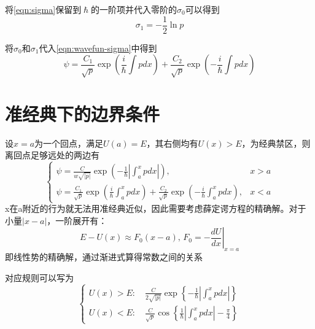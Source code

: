 \documentclass[12pt, a4paper, oneside]{ctexbook}
\newcounter{#2}
\newcounter{#2}[#1]
\numberwithin{#2}{#1}
\newcommand{\xkuo}[1]{\left(#1\right)}
\newcommand{\dkuo}[1]{\left\lbrace#1\right\rbrace}
\newcommand{\dao}[2]{\frac{d#1}{d#2}}
\newcommand{\ji}[2]{\int_{#1}^{#2}}
\newcommand{\jdz}[1]{\left|#1\right|}
\begin{document}
            \begin{deduce}
              将\autoref{eqn:sigma}保留到\(\hslash\)的一阶项并代入零阶的\(\sigma_0\)可以得到
              \begin{equation}
                \sigma_1=-\frac12\ln p
              \end{equation}
            \end{deduce}
            \begin{deduce}
              将\(\sigma_0\)和\(\sigma_1\)代入\autoref{eqn:wavefun-sigma}中得到
              \begin{equation}
                \psi=\frac{C_1}{\sqrt p}\exp\xkuo{\frac i\hslash\int pdx}+\frac{C_2}{\sqrt p}\exp\xkuo{-\frac i\hslash\int pdx}
              \end{equation}
            \end{deduce}
            \section{准经典下的边界条件}
            \begin{deduce}
              设\(x=a\)为一个回点，满足\(U(a)=E\)，其右侧均有\(U(x)>E\)，为经典禁区，则离回点足够远处的两边有
              \begin{equation}
                \begin{cases}
                  \psi=\frac{C}{w\sqrt{|p|}}\exp\xkuo{-\frac1\hslash\jdz{\ji{a}{x}pdx}}, &x>a\\
                  \psi=\frac{C_1}{\sqrt p}\exp\xkuo{\frac i\hslash\ji ax pdx}+\frac{C_2}{\sqrt p}\exp\xkuo{-\frac i\hslash\ji ax pdx},&x<a
                \end{cases}
              \end{equation}
              x在a附近的行为就无法用准经典近似，因此需要考虑薛定谔方程的精确解。对于小量\(|x-a|\)，一阶展开有：
              \begin{equation}
                E-U(x)\approx F_0(x-a),\, F_0=-\left.\dao Ux\right|_{x=a}
              \end{equation}
              即线性势的精确解，通过渐进式算得常数之间的关系
              
            \end{deduce}

            \begin{deduce}
              对应规则可以写为
              \begin{equation}\label{eqn:edge}
                \begin{cases}
                  U(x)>E:\quad \frac{C}{2\sqrt{|p|}}\exp\dkuo{-\frac1\hslash\jdz{\ji ax pdx}}\\
                  U(x)<E:\quad \frac{C}{\sqrt{p}}\cos\dkuo{\frac1\hslash\jdz{\ji ax pdx}-\frac\pi4}
                \end{cases}
              \end{equation}
            \end{deduce}
\end{document}
